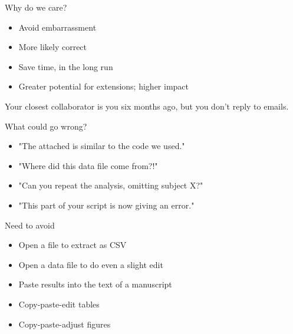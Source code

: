 \documentclass[12pt,t]{beamer}
\newcommand{\bi}{\begin{itemize}}
\newcommand{\ei}{\end{itemize}}
\begin{document}
\begin{frame}{Why do we care?}

\vspace{24pt}

\bi
\itemsep12pt
\item Avoid embarrassment
\item More likely correct
\item Save time, in the long run
\item Greater potential for extensions; higher impact
\ei

\end{frame}


\begin{frame}[c]{}

\centering
\large
Your closest collaborator is you six months ago, but you
don't reply to emails.
\end{frame}


\begin{frame}{What could go wrong?}

\vspace{24pt}

\bi
\itemsep12pt
\item "The attached is similar to the code we used."
\item "Where did this data file come from?!"
\item "Can you repeat the analysis, omitting subject X?"
\item "This part of your script is now giving an error."
\ei

\end{frame}


\begin{frame}{Need to avoid}


\vspace{24pt}

\bi
\itemsep12pt
\item Open a file to extract as CSV
\item Open a data file to do even a slight edit
\item Paste results into the text of a manuscript
\item Copy-paste-edit tables
\item Copy-paste-adjust figures
\ei

\end{frame}
\end{document}

